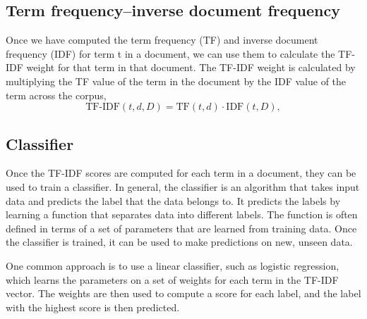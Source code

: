 \subsection*{Term frequency–inverse document frequency}
Once we have computed the term frequency (TF) and inverse document frequency (IDF) for term t in a document, we can use them to calculate the TF-IDF weight for that term in that document. The TF-IDF weight is calculated by multiplying the TF value of the term in the document by the IDF value of the term across the corpus,
\begin{equation}
    \text{TF-IDF}(t,d,D) = \text{TF}(t,d) \cdot \text{IDF}(t,D) ,
\end{equation}
\subsection*{Classifier}
Once the TF-IDF scores are computed for each term in a document, they can be used to train a classifier. In general, the classifier is an algorithm that takes input data and predicts the label that the data belongs to. It predicts the labels by learning a function that separates data into different labels. The function is often defined in terms of a set of parameters that are learned from training data. Once the classifier is trained, it can be used to make predictions on new, unseen data.

One common approach is to use a linear classifier, such as logistic regression, which learns the parameters on a set of weights for each term in the TF-IDF vector. The weights are then used to compute a score for each label, and the label with the highest score is then predicted.



